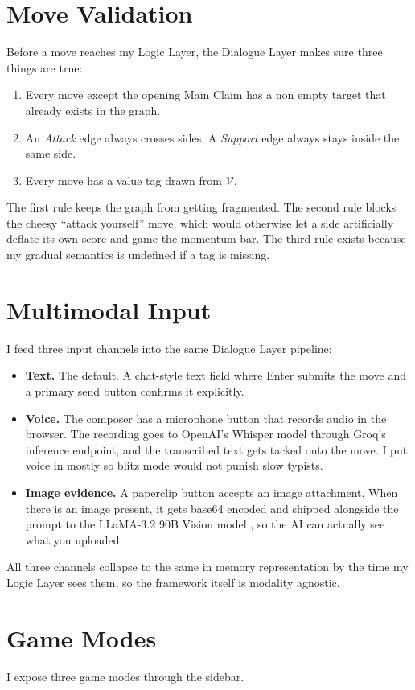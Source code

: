 \section{Move Validation}
Before a move reaches my Logic Layer, the Dialogue Layer makes sure three things are true:
\begin{enumerate}
    \item Every move except the opening Main Claim has a non empty target that already exists in the graph.
    \item An \emph{Attack} edge always crosses sides. A \emph{Support} edge always stays inside the same side.
    \item Every move has a value tag drawn from $\mathcal{V}$.
\end{enumerate}
The first rule keeps the graph from getting fragmented. The second rule blocks the cheesy ``attack yourself'' move, which would otherwise let a side artificially deflate its own score and game the momentum bar. The third rule exists because my gradual semantics is undefined if a tag is missing.

\section{Multimodal Input}
\label{sec:multimodal}
I feed three input channels into the same Dialogue Layer pipeline:
\begin{itemize}
    \item \textbf{Text.} The default. A chat-style text field where Enter submits the move and a primary send button confirms it explicitly.
    \item \textbf{Voice.} The composer has a microphone button that records audio in the browser. The recording goes to OpenAI's Whisper model \cite{radford2023whisper} through Groq's inference endpoint, and the transcribed text gets tacked onto the move. I put voice in mostly so blitz mode would not punish slow typists.
    \item \textbf{Image evidence.} A paperclip button accepts an image attachment. When there is an image present, it gets base64 encoded and shipped alongside the prompt to the LLaMA-3.2 90B Vision model \cite{meta2024llama3}, so the AI can actually see what you uploaded.
\end{itemize}
All three channels collapse to the same in memory representation by the time my Logic Layer sees them, so the framework itself is modality agnostic.

\section{Game Modes}
\label{sec:modes}
I expose three game modes through the sidebar.


